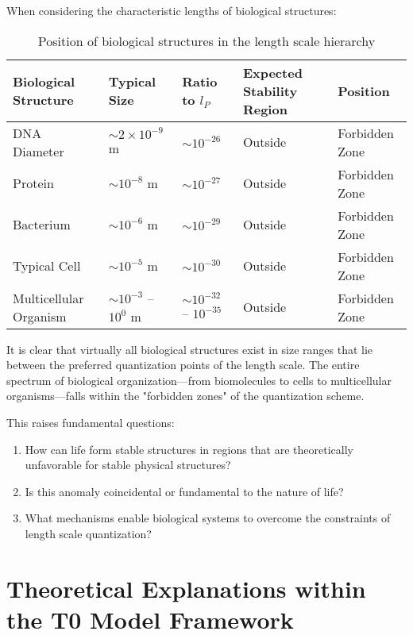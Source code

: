 \documentclass[12pt,a4paper]{article}
\begin{document}
	When considering the characteristic lengths of biological structures:
	
	\begin{table}[h]
		\centering
		\begin{adjustbox}{scale=0.7}
			\begin{tabular}{lllll}
				\hline
				\textbf{Biological Structure} & \textbf{Typical Size} & \textbf{Ratio to $l_P$} & \textbf{Expected Stability Region} & \textbf{Position} \\
				\hline
				DNA Diameter & $\sim 2 \times 10^{-9}$ m & $\sim 10^{-26}$ & Outside & Forbidden Zone \\
				Protein & $\sim 10^{-8}$ m & $\sim 10^{-27}$ & Outside & Forbidden Zone \\
				Bacterium & $\sim 10^{-6}$ m & $\sim 10^{-29}$ & Outside & Forbidden Zone \\
				Typical Cell & $\sim 10^{-5}$ m & $\sim 10^{-30}$ & Outside & Forbidden Zone \\
				Multicellular Organism & $\sim 10^{-3}$ – $10^{0}$ m & $\sim 10^{-32}$ – $10^{-35}$ & Outside & Forbidden Zone \\
				\hline
			\end{tabular}
		\end{adjustbox}
		\caption{Position of biological structures in the length scale hierarchy}
		\label{tab:bio_structures}
	\end{table}
	
	It is clear that virtually all biological structures exist in size ranges that lie between the preferred quantization points of the length scale. The entire spectrum of biological organization—from biomolecules to cells to multicellular organisms—falls within the "forbidden zones" of the quantization scheme.
	
	This raises fundamental questions:
	\begin{enumerate}
		\item How can life form stable structures in regions that are theoretically unfavorable for stable physical structures?
		\item Is this anomaly coincidental or fundamental to the nature of life?
		\item What mechanisms enable biological systems to overcome the constraints of length scale quantization?
	\end{enumerate}
	
	\section{Theoretical Explanations within the T0 Model Framework}
	\label{sec:theoretische_erklaerungen}
	
\end{document}

